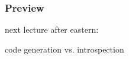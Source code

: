 

\begin{frame}
	\frametitle{Preview}
	next lecture after eastern:

	code generation vs. introspection
\end{frame}



\nocite{raab2016improving}

\appendix

\begin{frame}[allowframebreaks]
	
	
\end{frame}




